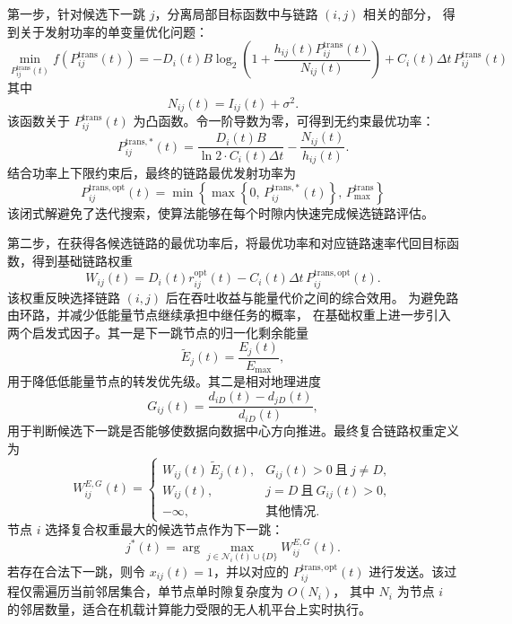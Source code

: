第一步，针对候选下一跳 $j$，分离局部目标函数中与链路 $(i,j)$ 相关的部分，
得到关于发射功率的单变量优化问题：
\begin{equation}
\min_{P_{ij}^{\mathrm{trans}}(t)} f\!\left(P_{ij}^{\mathrm{trans}}(t)\right) =-D_i(t)B\log_2\!\left(1+\frac{h_{ij}(t)P_{ij}^{\mathrm{trans}}(t)}{N_{ij}(t)}\right) +C_i(t)\Delta t\,P_{ij}^{\mathrm{trans}}(t) 
\end{equation}
其中
\begin{equation}
N_{ij}(t)=I_{ij}(t)+\sigma^2.  
\end{equation}
该函数关于 $P_{ij}^{\mathrm{trans}}(t)$ 为凸函数。令一阶导数为零，可得到无约束最优功率：
\begin{equation}
P_{ij}^{\mathrm{trans},*}(t)=\frac{D_i(t)B}{\ln 2\cdot C_i(t)\Delta t}-\frac{N_{ij}(t)}{h_{ij}(t)}.  
\end{equation}
结合功率上下限约束后，最终的链路最优发射功率为
\begin{equation}
P_{ij}^{\mathrm{trans,opt}}(t)=\min\!\left\{\max\!\left\{0,\,P_{ij}^{\mathrm{trans},*}(t)\right\},\,P_{\max}^{\mathrm{trans}}\right\}
\label{eq:leadr_power_opt}
\end{equation}
该闭式解避免了迭代搜索，使算法能够在每个时隙内快速完成候选链路评估。

第二步，在获得各候选链路的最优功率后，将最优功率和对应链路速率代回目标函数，得到基础链路权重
\begin{equation}
W_{ij}(t)=D_i(t)r_{ij}^{\mathrm{opt}}(t)-C_i(t)\Delta t\,P_{ij}^{\mathrm{trans,opt}}(t).  
\end{equation}
该权重反映选择链路 $(i,j)$ 后在吞吐收益与能量代价之间的综合效用。
为避免路由环路，并减少低能量节点继续承担中继任务的概率，
在基础权重上进一步引入两个启发式因子。其一是下一跳节点的归一化剩余能量
\begin{equation}
\tilde{E}_j(t)=\frac{E_j(t)}{E_{\max}},  
\end{equation}
用于降低低能量节点的转发优先级。其二是相对地理进度
\begin{equation}
G_{ij}(t)=\frac{d_{iD}(t)-d_{jD}(t)}{d_{iD}(t)},  
\end{equation}
用于判断候选下一跳是否能够使数据向数据中心方向推进。最终复合链路权重定义为
\begin{equation}
W_{ij}^{E,G}(t)=
\begin{cases}
W_{ij}(t)\,\tilde{E}_j(t), & G_{ij}(t)>0 \ \text{且}\ j\neq D,\\
W_{ij}(t), & j=D \ \text{且}\ G_{ij}(t)>0,\\
-\infty, & \text{其他情况}.
\end{cases}
\label{eq:leadr_composite_weight}
\end{equation}
节点 $i$ 选择复合权重最大的候选节点作为下一跳：
\begin{equation}
j^{*}(t)=\arg\max_{j\in\mathcal{N}_i(t)\cup\{D\}} W_{ij}^{E,G}(t).  
\end{equation}
若存在合法下一跳，则令 $x_{ij}(t)=1$，并以对应的 $P_{ij}^{\mathrm{trans,opt}}(t)$ 
进行发送。该过程仅需遍历当前邻居集合，单节点单时隙复杂度为 $O(N_i)$，
其中 $N_i$ 为节点 $i$ 的邻居数量，适合在机载计算能力受限的无人机平台上实时执行。

